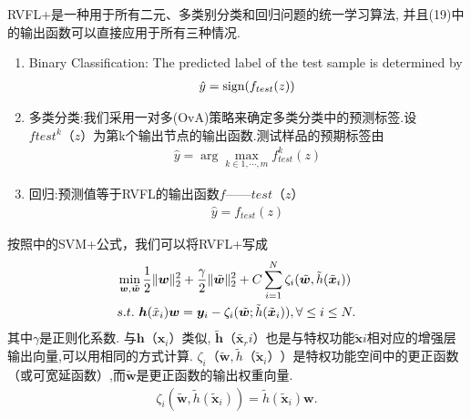 {RVFL+是一种用于所有二元、多类别分类和回归问题的统一学习算法, 并且(19)中的输出函数可以直接应用于所有三种情况.
\begin{enumerate}
  \item Binary Classification: The predicted label of the test sample is determined by
\begin{align}
  \hat y = \textup{sign}(f_{test}(z))
\end{align}
  \item %
      多类分类:我们采用一对多(OvA)策略来确定多类分类中的预测标签.设$f{test}^k（z）$为第k个输出节点的输出函数.测试样品的预期标签由
\begin{align}
  \hat y = \arg \max_{ k \in 1,\cdots,m} f_{test}^k (z)
\end{align}
  \item  %
  回归:预测值等于RVFL的输出函数$f——{{test}}（z）$
\begin{align}
  \hat y = f_{test}(z)
\end{align}
\end{enumerate}

按照\cite{VAPNIK2009544}中的SVM+公式，我们可以将RVFL+写成
\begin{align}
&\min\limits_{{\bm w},\tilde {\bm w}} \frac 1 2 \|{\bm w}\|_2^ 2 + \frac \gamma 2 \|\tilde {\bm w}\|_2^ 2 + C\sum_{i=1}^N \zeta_i (\tilde {\bm w}, {\tilde h}({\tilde {\bm x}}_i))\notag\\
&s.t.\,\, \bm h(\tilde x_i){\bm w} = \bm y_i - \zeta_i (\tilde {\bm w}; {\tilde h}({\tilde {\bm x}}_i)), \forall \leq i \leq  N.\label{RVFL20181102eq8}
\end{align}
其中$\gamma$是正则化系数. 与$\bm h（\bm x_i）$类似, ${\tilde{\bm h}}（{\tilde{\bm x_r}}i）$也是与特权功能${\tilde{\bm x}}i$相对应的增强层输出向量,可以用相同的方式计算.
$\zeta_i（\tilde{\bm w},{\tilde h}（\tilde{\bm x}_i））$是特权功能空间中的更正函数（或可宽延函数）,而$\tilde{\bm w}$是更正函数的输出权重向量.
\begin{align}\label{RVFL20181102eq9}
\zeta_i (\tilde {\bm w}, {\tilde h}({\tilde {\bm x}}_i)) = {\tilde h}({\tilde {\bm x}}_i){\bm w}.
\end{align}

}
